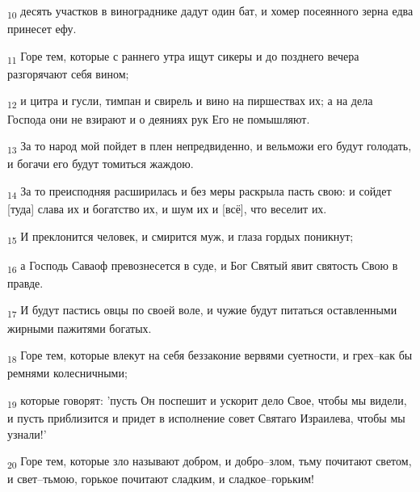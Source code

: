 \begin{tcolorbox}
\textsubscript{10} десять участков в винограднике дадут один бат, и хомер посеянного зерна едва принесет ефу.
\end{tcolorbox}
\begin{tcolorbox}
\textsubscript{11} Горе тем, которые с раннего утра ищут сикеры и до позднего вечера разгорячают себя вином;
\end{tcolorbox}
\begin{tcolorbox}
\textsubscript{12} и цитра и гусли, тимпан и свирель и вино на пиршествах их; а на дела Господа они не взирают и о деяниях рук Его не помышляют.
\end{tcolorbox}
\begin{tcolorbox}
\textsubscript{13} За то народ мой пойдет в плен непредвиденно, и вельможи его будут голодать, и богачи его будут томиться жаждою.
\end{tcolorbox}
\begin{tcolorbox}
\textsubscript{14} За то преисподняя расширилась и без меры раскрыла пасть свою: и сойдет [туда] слава их и богатство их, и шум их и [всё], что веселит их.
\end{tcolorbox}
\begin{tcolorbox}
\textsubscript{15} И преклонится человек, и смирится муж, и глаза гордых поникнут;
\end{tcolorbox}
\begin{tcolorbox}
\textsubscript{16} а Господь Саваоф превознесется в суде, и Бог Святый явит святость Свою в правде.
\end{tcolorbox}
\begin{tcolorbox}
\textsubscript{17} И будут пастись овцы по своей воле, и чужие будут питаться оставленными жирными пажитями богатых.
\end{tcolorbox}
\begin{tcolorbox}
\textsubscript{18} Горе тем, которые влекут на себя беззаконие вервями суетности, и грех--как бы ремнями колесничными;
\end{tcolorbox}
\begin{tcolorbox}
\textsubscript{19} которые говорят: 'пусть Он поспешит и ускорит дело Свое, чтобы мы видели, и пусть приблизится и придет в исполнение совет Святаго Израилева, чтобы мы узнали!'
\end{tcolorbox}
\begin{tcolorbox}
\textsubscript{20} Горе тем, которые зло называют добром, и добро--злом, тьму почитают светом, и свет--тьмою, горькое почитают сладким, и сладкое--горьким!
\end{tcolorbox}
